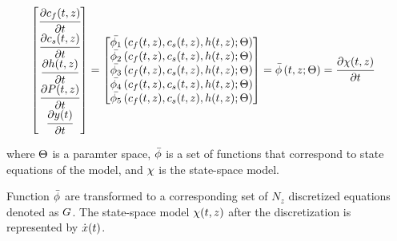 \documentclass[../Article_Model_Parameters.tex]{subfiles}
\begin{document}
		{\footnotesize
			\begin{align}
				\begin{bmatrix}
					\cfrac{\partial {\color{black}c_f}(t,z)}{\partial t}\\
					\cfrac{\partial {\color{black}c_s}(t,z)}{\partial t}\\
					\cfrac{\partial {\color{black}h}(t,z)}{\partial t} \\
					\cfrac{\partial {\color{black}P}(t,z)}{\partial t} \\
					\cfrac{\partial {\color{black}y}(t)}{\partial t} 
				\end{bmatrix}
				& =
				\begin{bmatrix}
					{\color{black}\bar{\phi_1}} \left( {\color{black}c_f}(t,z),{\color{black}c_s}(t,z),{\color{black}h}(t,z); {\color{black}\Theta} \right)\\
					{\color{black}\bar{\phi_2}} \left( {\color{black}c_f}(t,z),{\color{black}c_s}(t,z),{\color{black}h}(t,z); {\color{black}\Theta} \right)\\
					{\color{black}\bar{\phi_3}} \left( {\color{black}c_f}(t,z),{\color{black}c_s}(t,z),{\color{black}h}(t,z); {\color{black}\Theta} \right) \\
					{\color{black}\bar{\phi_4}} \left( {\color{black}c_f}(t,z),{\color{black}c_s}(t,z),{\color{black}h}(t,z); {\color{black}\Theta} \right)\\
					{\color{black}\bar{\phi_5}} \left( {\color{black}c_f}(t,z),{\color{black}c_s}(t,z),{\color{black}h}(t,z); {\color{black}\Theta} \right)
				\end{bmatrix} = {\color{black}\bar{\phi}} \left( t,z; {\color{black}\Theta} \right) = \cfrac{\partial {\color{black}\chi}(t,z)}{\partial t}
		\end{align} }
			
		where ${\color{black}\Theta}$ is a paramter space, ${\color{black}\bar{\phi}}$ is a set of functions that correspond to state equations of the model, and ${\color{black}\chi}$ is the state-space model.
		
		Function ${\color{black}\bar{\phi}}$ are transformed to a corresponding set of $N_z$ discretized equations denoted as ${\color{black}G}$. The state-space model ${\color{black}\chi}(t,z)$ after the discretization is represented by $\dot{{\color{black}x}}(t)$.
			
\end{document}
